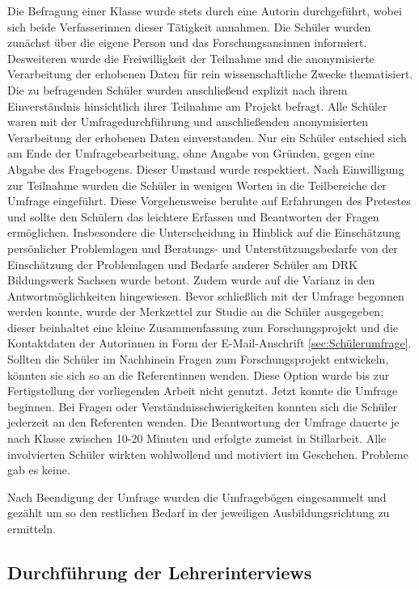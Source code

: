 Die Befragung einer Klasse wurde stets durch eine Autorin durchgeführt, wobei sich beide Verfasserinnen dieser Tätigkeit annahmen.
Die Schüler wurden zunächst über die eigene Person und das Forschungsansinnen informiert. Desweiteren wurde die Freiwilligkeit der Teilnahme und die anonymisierte Verarbeitung der erhobenen Daten für rein wissenschaftliche Zwecke thematisiert. Die zu befragenden Schüler wurden anschließend explizit nach ihrem Einverständnis hinsichtlich ihrer Teilnahme am Projekt befragt. Alle Schüler waren mit der Umfragedurchführung und anschließenden anonymisierten Verarbeitung der erhobenen Daten einverstanden. Nur ein Schüler entschied sich am Ende der Umfragebearbeitung, ohne Angabe von Gründen, gegen eine Abgabe des Fragebogens. Dieser Umstand wurde respektiert. Nach Einwilligung zur Teilnahme wurden die Schüler in wenigen Worten in die Teilbereiche der Umfrage eingeführt. Diese Vorgehensweise beruhte auf Erfahrungen des Pretestes und sollte den Schülern das leichtere Erfassen und Beantworten der Fragen ermöglichen. Insbesondere die Unterscheidung in Hinblick auf die Einschätzung persönlicher Problemlagen und Beratungs- und Unterstützungsbedarfe von der Einschätzung der Problemlagen und Bedarfe anderer Schüler am DRK Bildungswerk Sachsen wurde betont. Zudem wurde auf die Varianz in den Antwortmöglichkeiten hingewiesen. Bevor schließlich mit der Umfrage begonnen werden konnte, wurde der Merkzettel zur Studie an die Schüler ausgegeben; dieser beinhaltet eine kleine Zusammenfassung zum Forschungsprojekt und die Kontaktdaten der Autorinnen in Form der E-Mail-Anschrift \ref{sec:Schülerumfrage}. Sollten die Schüler im Nachhinein Fragen zum Forschungsprojekt entwickeln, könnten sie sich so an die Referentinnen wenden. Diese Option wurde bis zur Fertigstellung der vorliegenden Arbeit nicht genutzt. Jetzt konnte die Umfrage beginnen. Bei Fragen oder Verständnisschwierigkeiten konnten sich die Schüler jederzeit an den Referenten wenden. Die Beantwortung der Umfrage dauerte je nach Klasse zwischen 10-20 Minuten und erfolgte zumeist in Stillarbeit. Alle involvierten Schüler wirkten wohlwollend und motiviert im Geschehen. Probleme gab es keine.

Nach Beendigung der Umfrage wurden die Umfragebögen eingesammelt und gezählt um so den restlichen Bedarf in der jeweiligen Ausbildungsrichtung zu ermitteln.

\subsection{Durchführung der Lehrerinterviews}
\label{sec:DurchführungDerLehrerinterviews}

